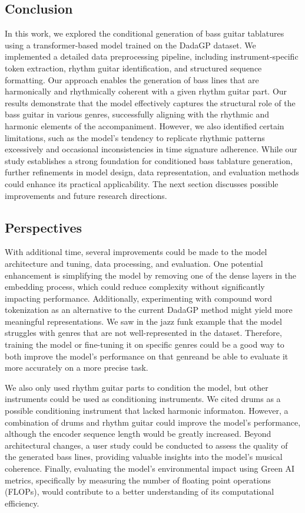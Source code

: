 \subsection{Conclusion}  

In this work, we explored the conditional generation of bass guitar tablatures using a transformer-based model trained on the DadaGP dataset.
We implemented a detailed data preprocessing pipeline, including instrument-specific token extraction, rhythm guitar identification, and structured sequence formatting.
Our approach enables the generation of bass lines that are harmonically and rhythmically coherent with a given rhythm guitar part.  
Our results demonstrate that the model effectively captures the structural role of the bass guitar in various genres, successfully aligning with the rhythmic and harmonic elements of the accompaniment.
However, we also identified certain limitations, such as the model's tendency to replicate rhythmic patterns excessively and occasional inconsistencies in time signature adherence.
While our study establishes a strong foundation for conditioned bass tablature generation, further refinements in model design, data representation, and evaluation methods could enhance its practical applicability.
The next section discusses possible improvements and future research directions.

\subsection{Perspectives}

With additional time, several improvements could be made to the model architecture and tuning, data processing, and evaluation.
One potential enhancement is simplifying the model by removing one of the dense layers in the embedding process, which could reduce complexity without significantly impacting performance.
Additionally, experimenting with compound word tokenization as an alternative to the current DadaGP method might yield more meaningful representations.
We saw in the jazz funk example that the model struggles with genres that are not well-represented in the dataset.
Therefore, training the model or fine-tuning it on specific genres could be a good way to both improve the model's performance on that genreand be able to evaluate it more accurately on a more precise task.

We also only used rhythm guitar parts to condition the model, but other instruments could be used as conditioning instruments.
We cited drums as a possible conditioning instrument that lacked harmonic informaton.
However, a combination of drums and rhythm guitar could improve the model's performance, although the encoder sequence length would be greatly increased.
Beyond architectural changes, a user study could be conducted to assess the quality of the generated bass lines, providing valuable insights into the model's musical coherence.
Finally, evaluating the model's environmental impact using Green AI~\cite{schwartz_green_2020} metrics, specifically by measuring the number of floating point operations (FLOPs), would contribute to a better understanding of its computational efficiency.

